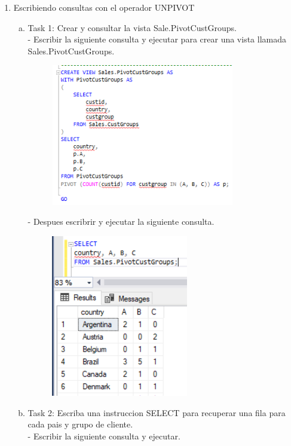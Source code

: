 \begin{enumerate}[1.]
	\item Escribiendo consultas con el operador UNPIVOT
	\begin{enumerate}[a)]
	\item Task 1: Crear y consultar la vista Sale.PivotCustGroups.\\
		-  Escribir la siguiente consulta y ejecutar para crear una vista llamada Sales.PivotCustGroups.\\
		\begin{figure}[H]
		\begin{center}
		\includegraphics[width=8cm]{./Imagenes/e2-1}
		\end{center}
		\end{figure}
		-  Despues escribrir y ejecutar la siguiente consulta.
		\begin{figure}[H]
		\begin{center}
		\includegraphics[width=6cm]{./Imagenes/e1-1-1}
		\end{center}
		\end{figure}
	\item Task 2: Escriba una instruccion SELECT para recuperar una fila para cada pais y grupo de cliente.\\
		-  Escribir la siguiente consulta y ejecutar.\\

\end{enumerate}
\end{enumerate}
